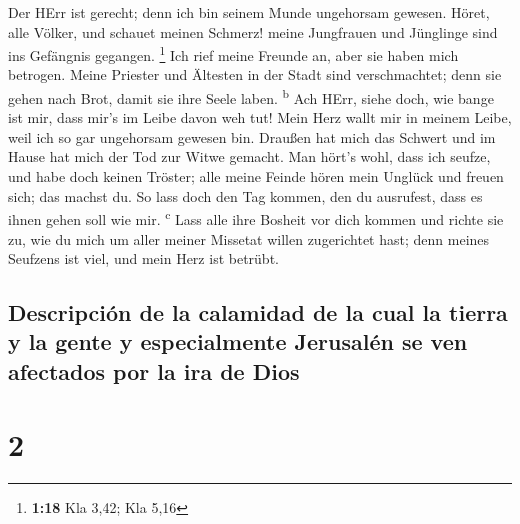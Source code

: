  Der HErr ist gerecht; denn ich bin seinem Munde
ungehorsam gewesen. Höret, alle Völker, und schauet meinen Schmerz!
meine Jungfrauen und Jünglinge sind ins Gefängnis gegangen. \footnote{\textbf{1:18}
  Kla 3,42; Kla 5,16}  Ich rief meine Freunde an, aber
sie haben mich betrogen. Meine Priester und Ältesten in der Stadt sind
verschmachtet; denn sie gehen nach Brot, damit sie ihre Seele laben.
\textsuperscript{b}  Ach HErr, siehe doch, wie bange ist
mir, dass mir's im Leibe davon weh tut! Mein Herz wallt mir in meinem
Leibe, weil ich so gar ungehorsam gewesen bin. Draußen hat mich das
Schwert und im Hause hat mich der Tod zur Witwe gemacht. 
Man hört's wohl, dass ich seufze, und habe doch keinen Tröster; alle
meine Feinde hören mein Unglück und freuen sich; das machst du. So lass
doch den Tag kommen, den du ausrufest, dass es ihnen gehen soll wie mir.
\textsuperscript{c}  Lass alle ihre Bosheit vor dich
kommen und richte sie zu, wie du mich um aller meiner Missetat willen
zugerichtet hast; denn meines Seufzens ist viel, und mein Herz ist
betrübt.

\hypertarget{descripciuxf3n-de-la-calamidad-de-la-cual-la-tierra-y-la-gente-y-especialmente-jerusaluxe9n-se-ven-afectados-por-la-ira-de-dios}{%
\subsection{Descripción de la calamidad de la cual la tierra y la gente
y especialmente Jerusalén se ven afectados por la ira de
Dios}\label{descripciuxf3n-de-la-calamidad-de-la-cual-la-tierra-y-la-gente-y-especialmente-jerusaluxe9n-se-ven-afectados-por-la-ira-de-dios}}

\hypertarget{section-1}{%
\section{2}\label{section-1}}


